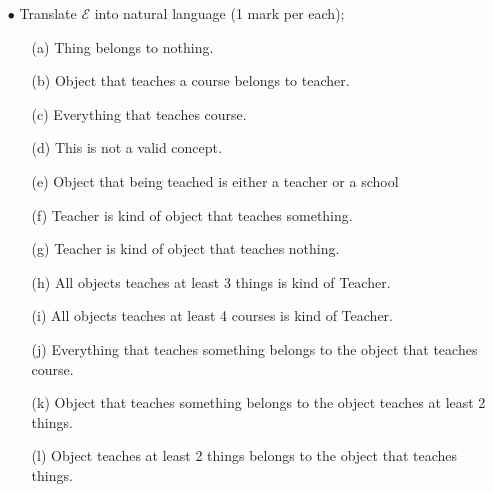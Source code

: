 \documentclass{article}
\begin{document}
\begin{itemize}
    \item[$\bullet$] Translate $\mathcal{E}$ into natural language (1 mark per each);
    \begin{itemize}
    \item[(a)] Thing belongs to nothing.
    \item[(b)] Object that teaches a course belongs to teacher.
    \item[(c)] Everything that teaches course.
    \item[(d)] This is not a valid concept.
    \item[(e)] Object that being teached is either a teacher or a school
    \item[(f)] Teacher is kind of object that teaches something.
    \item[(g)] Teacher is kind of object that teaches nothing.
    \item[(h)] All objects teaches at least 3 things is kind of Teacher.
    \item[(i)] All objects teaches at least 4 courses is kind of Teacher.
    \item[(j)] Everything that teaches something belongs to the object that teaches course.
    \item[(k)] Object that teaches something belongs to the object teaches at least 2 things.
    \item[(l)] Object teaches at least 2 things belongs to the object that teaches things.
    \end{itemize}


\end{itemize}
\end{document}
